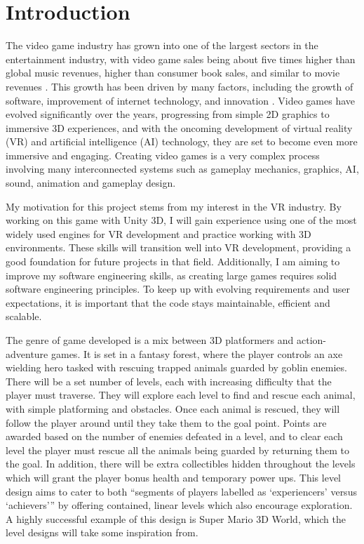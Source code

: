 \documentclass[10pt]{final_report}
\begin{document}
\chapter{Introduction}
The video game industry has grown into one of the largest sectors in the entertainment industry, with video game sales being about five times higher than global music revenues, higher than consumer book sales, and similar to movie revenues \cite{marchand2013value}. This growth has been driven by many factors, including the growth of software, improvement of internet technology, and innovation \cite{zackariasson2012video} . Video games have evolved significantly over the years, progressing from simple 2D graphics to immersive 3D experiences, and with the oncoming development of virtual reality (VR) and artificial intelligence (AI) technology, they are set to become even more immersive and engaging. Creating video games is a very complex process involving many interconnected systems such as gameplay mechanics, graphics, AI, sound, animation and gameplay design. \newline

My motivation for this project stems from my interest in the VR industry. By working on this game with Unity 3D, I will gain experience using one of the most widely used engines for VR development and practice working with 3D environments. These skills will transition well into VR development, providing a good foundation for future projects in that field. Additionally, I am aiming to improve my software engineering skills, as creating large games requires solid software engineering principles. To keep up with evolving requirements and user expectations, it is important that the code stays maintainable, efficient and scalable.\newline

The genre of game developed is a mix between 3D platformers and action-adventure games. It is set in a fantasy forest, where the player controls an axe wielding hero tasked with rescuing trapped animals guarded by goblin enemies. There will be a set number of levels, each with increasing difficulty that the player must traverse. They will explore each level to find and rescue each animal, with simple platforming and obstacles. Once each animal is rescued, they will follow the player around until they take them to the goal point. Points are awarded based on the number of enemies defeated in a level, and to clear each level the player must rescue all the animals being guarded by returning them to the goal. In addition, there will be extra collectibles hidden throughout the levels which will grant the player bonus health and temporary power ups. This level design aims to cater to both ``segments of players labelled as `experiencers' versus `achievers''' \cite{zhao2022dynamic} by offering contained, linear levels which also encourage exploration. A highly successful example of this design is Super Mario 3D World, which the level designs will take some inspiration from.\newline
\end{document}
